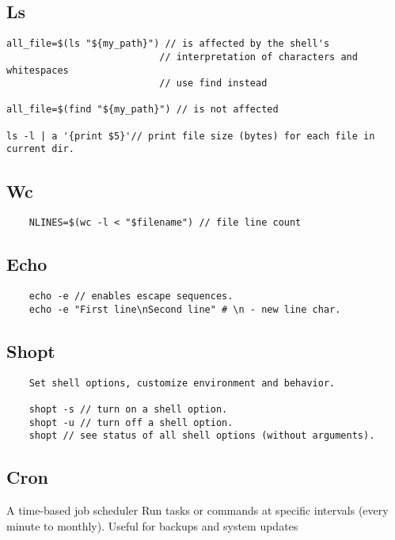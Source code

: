 \subsection{Ls}

\begin{verbatim}
all_file=$(ls "${my_path}") // is affected by the shell's
                           // interpretation of characters and whitespaces
                           // use find instead 

all_file=$(find "${my_path}") // is not affected

ls -l | a '{print $5}'// print file size (bytes) for each file in current dir.
\end{verbatim}

\subsection{Wc}

\begin{verbatim}
    NLINES=$(wc -l < "$filename") // file line count
\end{verbatim}

\subsection{Echo}
\begin{verbatim}
    echo -e // enables escape sequences.
    echo -e "First line\nSecond line" # \n - new line char.
\end{verbatim}

\subsection{Shopt}

\begin{verbatim}
    Set shell options, customize environment and behavior.

    shopt -s // turn on a shell option.
    shopt -u // turn off a shell option.
    shopt // see status of all shell options (without arguments).
\end{verbatim}

\subsection{Cron}

A time-based job scheduler 
Run tasks or commands at specific intervals (every minute to monthly). 
Useful for backups and system updates 

